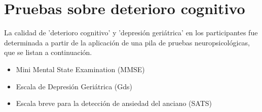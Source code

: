 
\section{Pruebas sobre deterioro cognitivo}

La calidad de 'deterioro cognitivo' y 'depresi\'on geri\'atrica' en los participantes fue
determinada a partir de la aplicaci\'on de una pila de pruebas neuropsicol\'ogicas, que se
listan a continuaci\'on.

\begin{itemize}

\item {Mini Mental State Examination (MMSE)} 
\cite{Velasco15}

\item {Escala de Depresi\'on Geri\'atrica (Gds)} 
\cite{Greenberg12,Cuijpers13}

\item {Escala breve para la detecci\'on de ansiedad del anciano (SATS)} 
\cite{Vargas11}


\end{itemize}
